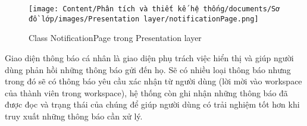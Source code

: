 \begin{figure}[H]
    \centering
    \texttt{[image: Content/Phân tích và thiết kế hệ thống/documents/Sơ đồ lớp/images/Presentation layer/notificationPage.png]}
    \vspace{0.5cm}
    \caption{Class NotificationPage trong Presentation layer}
    \label{fig:Class NotificationPage trong Presentation layer}
\end{figure}
Giao diện thông báo cá nhân là giao diện phụ trách việc hiển thị và giúp người dùng phản hồi những thông báo gửi đến họ. Sẽ có nhiều loại thông báo nhưng trong đó sẽ có thông báo yêu cầu xác nhận từ người dùng (lời mời vào workspace của thành viên trong workspace), hệ thống còn ghi nhận những thông báo đã được đọc và trạng thái của chúng để giúp người dùng có trải nghiệm tốt hơn khi truy xuất những thông báo cần xử lý.